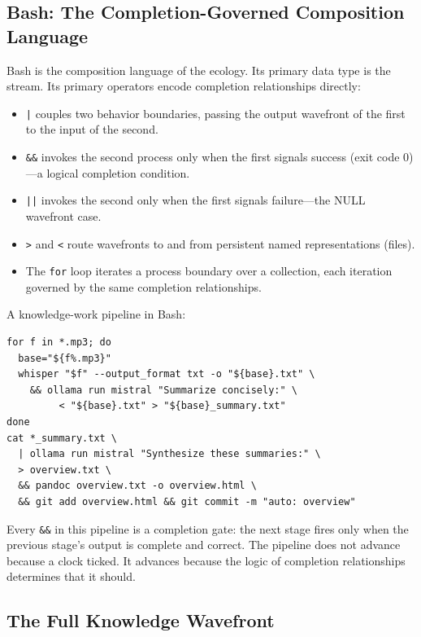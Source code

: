 \documentclass[12pt, a4paper]{article}
\begin{document}
\subsection{Bash: The Completion-Governed Composition Language}

Bash is the composition language of the ecology. Its primary data type
is the stream. Its primary operators encode completion relationships
directly:

\begin{itemize}
\item \texttt{|} couples two behavior boundaries, passing the output
  wavefront of the first to the input of the second.
\item \texttt{\&\&} invokes the second process only when the first
  signals success (exit code 0)---a logical completion condition.
\item \texttt{||} invokes the second only when the first signals
  failure---the NULL wavefront case.
\item \texttt{>} and \texttt{<} route wavefronts to and from
  persistent named representations (files).
\item The \texttt{for} loop iterates a process boundary over a
  collection, each iteration governed by the same completion
  relationships.
\end{itemize}

A knowledge-work pipeline in Bash:

\begin{lstlisting}
for f in *.mp3; do
  base="${f%.mp3}"
  whisper "$f" --output_format txt -o "${base}.txt" \
    && ollama run mistral "Summarize concisely:" \
         < "${base}.txt" > "${base}_summary.txt"
done
cat *_summary.txt \
  | ollama run mistral "Synthesize these summaries:" \
  > overview.txt \
  && pandoc overview.txt -o overview.html \
  && git add overview.html && git commit -m "auto: overview"
\end{lstlisting}

Every \texttt{\&\&} in this pipeline is a completion gate: the next
stage fires only when the previous stage's output is complete and
correct. The pipeline does not advance because a clock ticked. It
advances because the logic of completion relationships determines that
it should.

\subsection{The Full Knowledge Wavefront}
\end{document}
